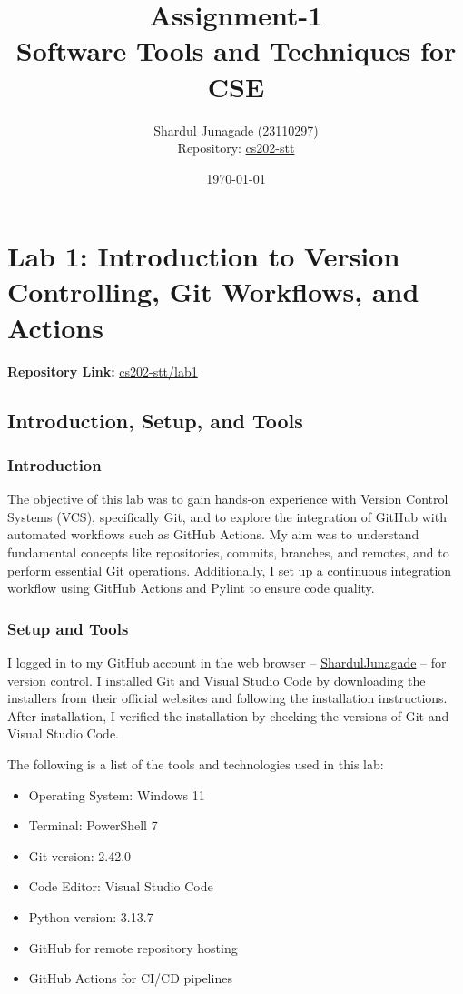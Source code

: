 \documentclass[10pt,a4paper]{report}
\title{\Huge Assignment-1 \\[0.5cm] \LARGE Software Tools and Techniques for CSE}
\author{\Large Shardul Junagade (23110297) \\[0.2cm] \Large Repository: \href{https://github.com/ShardulJunagade/cs202-stt}{cs202-stt}}
\date{\large \today}
\begin{document}
\maketitle
\newpage

\tableofcontents
\newpage


\chapter{Lab 1: Introduction to Version Controlling, Git Workflows, and Actions}

\textbf{Repository Link:} \href{https://github.com/ShardulJunagade/cs202-stt/tree/main/lab1}{cs202-stt/lab1}

\section{Introduction, Setup, and Tools}

\subsection{Introduction}
The objective of this lab was to gain hands-on experience with Version Control Systems (VCS), specifically Git, and to explore the integration of GitHub with automated workflows such as GitHub Actions. My aim was to understand fundamental concepts like repositories, commits, branches, and remotes, and to perform essential Git operations. Additionally, I set up a continuous integration workflow using GitHub Actions and Pylint to ensure code quality.

\subsection{Setup and Tools}
I logged in to my GitHub account in the web browser -- \href{https://github.com/ShardulJunagade}{ShardulJunagade} -- for version control. I installed Git and Visual Studio Code by downloading the installers from their official websites and following the installation instructions. After installation, I verified the installation by checking the versions of Git and Visual Studio Code.

\begingroup
The following is a list of the tools and technologies used in this lab:
\begin{itemize}[itemsep=0.05em, topsep=0pt]
    \item Operating System: Windows 11
    \item Terminal: PowerShell 7
    \item Git version: 2.42.0
    \item Code Editor: Visual Studio Code
    \item Python version: 3.13.7
    \item GitHub for remote repository hosting
    \item GitHub Actions for CI/CD pipelines
\end{itemize}
\endgroup
\end{document}
